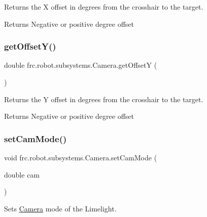 Returns the X offset in degrees from the crosshair to the target. 

\begin{DoxyReturn}{Returns}
Negative or positive degree offset 
\end{DoxyReturn}
\mbox{\label{classfrc_1_1robot_1_1subsystems_1_1_camera_a97f08ee461cdc433aae3a8d5a8b8388a}} 
\subsubsection{\texorpdfstring{getOffsetY()}{getOffsetY()}}
{\footnotesize\ttfamily double frc.\+robot.\+subsystems.\+Camera.\+get\+OffsetY (\begin{DoxyParamCaption}{ }\end{DoxyParamCaption})\hspace{0.3cm}{\ttfamily [inline]}}



Returns the Y offset in degrees from the crosshair to the target. 

\begin{DoxyReturn}{Returns}
Negative or positive degree offset 
\end{DoxyReturn}
\mbox{\label{classfrc_1_1robot_1_1subsystems_1_1_camera_a3139edef938fb996933614b77b07768e}} 
\subsubsection{\texorpdfstring{setCamMode()}{setCamMode()}}
{\footnotesize\ttfamily void frc.\+robot.\+subsystems.\+Camera.\+set\+Cam\+Mode (\begin{DoxyParamCaption}\item[{double}]{cam }\end{DoxyParamCaption})\hspace{0.3cm}{\ttfamily [inline]}}



Sets \mbox{\hyperlink{classfrc_1_1robot_1_1subsystems_1_1_camera}{Camera}} mode of the Limelight. 


